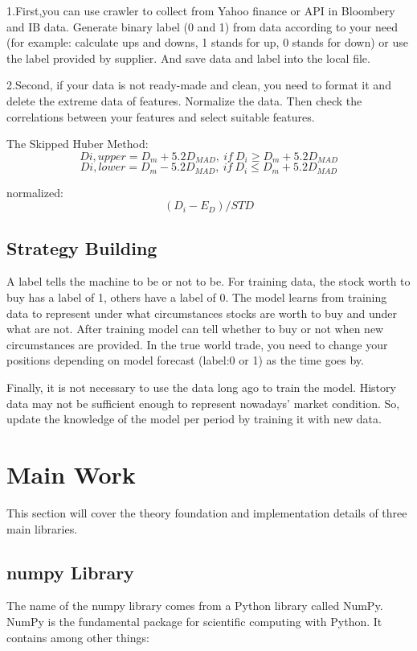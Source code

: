 \documentclass[a4paper]{article}
\begin{document}
1.First,you can use crawler to collect from Yahoo finance or API in Bloombery and IB data. Generate binary label (0 and 1) from data according to your need (for example: calculate ups and downs, 1 stands for up, 0 stands for down) or use the label provided by supplier. And save data and label into the local file.


2.Second, if your data is not ready-made and clean, you need to format it and delete the extreme data of features. Normalize the data. Then check the correlations between your features and select suitable features.

The Skipped Huber Method:
\[ D{i,upper} = D_m +5.2D_{MAD},     \ if \ D_i \geq D_m+5.2D_{MAD} \]
\[ D{i,lower} = D_m -5.2D_{MAD},     \ if \ D_i \leq D_m+5.2D_{MAD} \]

normalized:\[ (D_i-E_D)/STD\]

\subsection{Strategy Building}
A label tells the machine to be or not to be. For training data, the stock worth to buy has a label of 1, others have a label of 0. The model learns from training data to represent under what circumstances stocks are worth to buy and under what are not. After training model can tell whether to buy or not when new circumstances are provided. In the true world trade, you need to change your positions depending on model forecast (label:0 or 1) as the time goes by. 


Finally, it is not necessary to use the data long ago to train the model. History data may not be sufficient enough to represent nowadays’ market condition. So, update the knowledge of the model per period by training it with new data.

\section{Main Work}
This section will cover the theory foundation and implementation details of three main libraries.   

\subsection{numpy Library}
The name of the numpy library comes from a Python library called NumPy. NumPy is the fundamental package for scientific computing with Python.\cite{nano2} It contains among other things:
\end{document}
